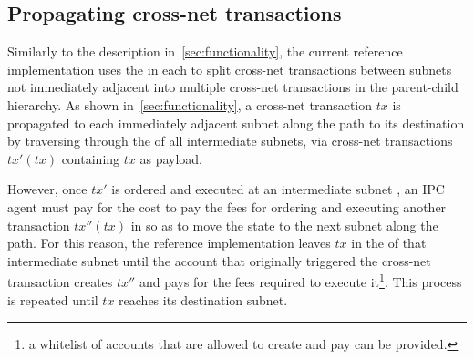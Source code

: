  

\subsection{Propagating cross-net transactions}
\label{sec:cnetrefimpl} 
Similarly to the description in~\cref{sec:functionality}, the current reference implementation uses the \postoffice in each \gw to split cross-net transactions between subnets not immediately adjacent into multiple cross-net transactions in the parent-child hierarchy. As shown in~\cref{sec:functionality}, a cross-net transaction $tx$ is propagated to each immediately adjacent subnet along the path to its destination by traversing through the \postoffice of all intermediate subnets, via cross-net transactions $tx'(tx)$ containing $tx$ as payload. 

However, once $tx'$ is ordered and executed at an intermediate subnet , an IPC agent must pay for the cost to pay the fees for ordering and executing another transaction $tx''(tx)$ in  so as to move the state to the next subnet along the path. For this reason, the reference implementation leaves $tx$ in the \postoffice of that intermediate subnet until the account that originally triggered the cross-net transaction creates $tx''$ and pays for the fees required to execute it\footnote{a whitelist of accounts that are allowed to create and pay can be provided.}. This process is repeated until $tx$ reaches its destination subnet.

